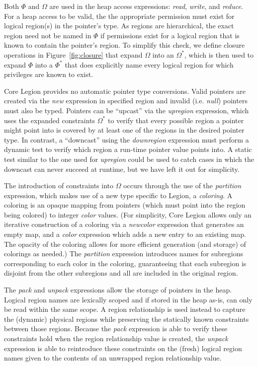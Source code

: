 Both $\Phi$ and $\Omega$ are used in the heap access expressions: {\em read}, {\em write}, and {\em reduce}.
For a heap access to be valid, the the appropriate permission must exist for logical region(s) in the
pointer's type.  As regions are hierarchical, the exact region need not be named in $\Phi$ if permissions
exist for a logical region that is known to contain the pointer's region.  To simplify this check, we
define closure operations in Figure~\ref{fig:closure} that expand $\Omega$ into an $\Omega^*$, which is
then used to expand $\Phi$ into a $\Phi^*$ that does explicitly name every logical region for which
privileges are known to exist.

Core Legion provides no automatic pointer type conversions.  Valid pointers are created via the {\em new}
expression in specified region and invalid (i.e. {\em null}) pointers must also be typed.  Pointers can be
``upcast'' via the {\em upregion} expression, which uses the expanded constraints $\Omega^*$ to verify that
every possible region a pointer might point into is covered by at least one of the regions in the desired
pointer type.  In contrast, a ``downcast'' using the {\em downregion} expression must perform a dynamic
test to verify which region a run-time pointer value points into.  A static test similar to the one used
for {\em upregion} could be used to catch cases in which the downcast can never succeed at runtime, but we
have left it out for simplicity.

The introduction of constraints into $\Omega$ occurs through the use of the {\em partition} expression,
which makes use of a new type specific to Legion, a {\em coloring}.  A coloring is an opaque mapping from
pointers (which must point into the region being colored) to integer {\em color} values.  (For simplicity, 
Core Legion allows only an iterative construction of a coloring via a {\em newcolor} expression that generates
an empty map, and a {\em color} expression which adds a new entry to an existing map. The opacity of the
coloring allows for more efficient generation (and storage) of colorings as needed.)  The {\em partition} 
expression introduces names for subregions corresponding to each color in the coloring, guaranteeing that each
subregion is disjoint from the other subregions and all are included in the original region.

The {\em pack} and {\em unpack} expressions allow the storage of pointers in the heap.  Logical region names
are lexically scoped and if stored in the heap as-is, can only be read within the same scope.  A region relationship
is used instead to capture the (dynamic) physical regions while preserving the statically known constraints
between those regions.  Because the {\em pack} expression is able to verify these constraints hold when the 
region relationship value is created, the {\em unpack} expression is able to reintroduce these constraints on
the (fresh) logical region names given to the contents of an unwrapped region relationship value.

